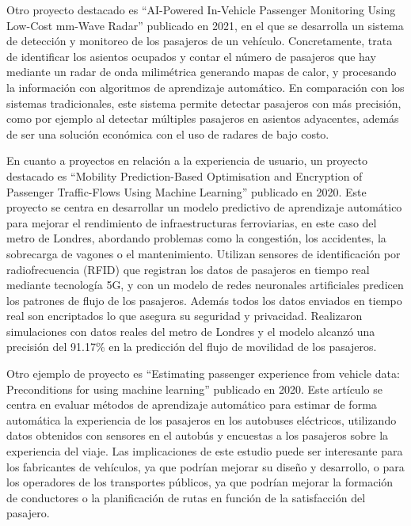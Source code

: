 \documentclass[12pt]{report} %
\begin{document}
Otro proyecto destacado es “AI-Powered In-Vehicle Passenger Monitoring Using Low-Cost mm-Wave Radar” \cite{rw2} publicado en 2021, en el que se desarrolla un sistema de detección y monitoreo de los pasajeros de un vehículo. Concretamente, trata de identificar los asientos ocupados y contar el número de pasajeros que hay mediante un radar de onda milimétrica generando mapas de calor, y procesando la información con algoritmos de aprendizaje automático. En comparación con los sistemas tradicionales, este sistema permite detectar pasajeros con más precisión, como por ejemplo al detectar múltiples pasajeros en asientos adyacentes, además de ser una solución económica con el uso de radares de bajo costo.

En cuanto a proyectos en relación a la experiencia de usuario, un proyecto destacado es “Mobility Prediction-Based Optimisation and Encryption of Passenger Traffic-Flows Using Machine Learning” \cite{rw3} publicado en 2020. Este proyecto se centra en desarrollar un modelo predictivo de aprendizaje automático para mejorar el rendimiento de infraestructuras ferroviarias, en este caso del metro de Londres, abordando problemas como la congestión, los accidentes, la sobrecarga de vagones o el mantenimiento. Utilizan sensores de identificación por radiofrecuencia (RFID) que registran los datos de pasajeros en tiempo real mediante tecnología 5G, y con un modelo de redes neuronales artificiales predicen los patrones de flujo de los pasajeros. Además todos los datos enviados en tiempo real son encriptados lo que asegura su seguridad y privacidad. Realizaron simulaciones con datos reales del metro de Londres y el modelo alcanzó una precisión del 91.17\% en la predicción del flujo de movilidad de los pasajeros.

Otro ejemplo de proyecto es “Estimating passenger experience from vehicle data: Preconditions for using machine learning” \cite{rw4} publicado en 2020. Este artículo se centra en evaluar métodos de aprendizaje automático para estimar de forma automática la experiencia de los pasajeros en los autobuses eléctricos, utilizando datos obtenidos con sensores en el autobús y encuestas a los pasajeros sobre la experiencia del viaje. Las implicaciones de este estudio puede ser interesante para los fabricantes de vehículos, ya que podrían mejorar su diseño y desarrollo, o para los operadores de los transportes públicos, ya que podrían mejorar la formación de conductores o la planificación de rutas en función de la satisfacción del pasajero. 
\end{document}
